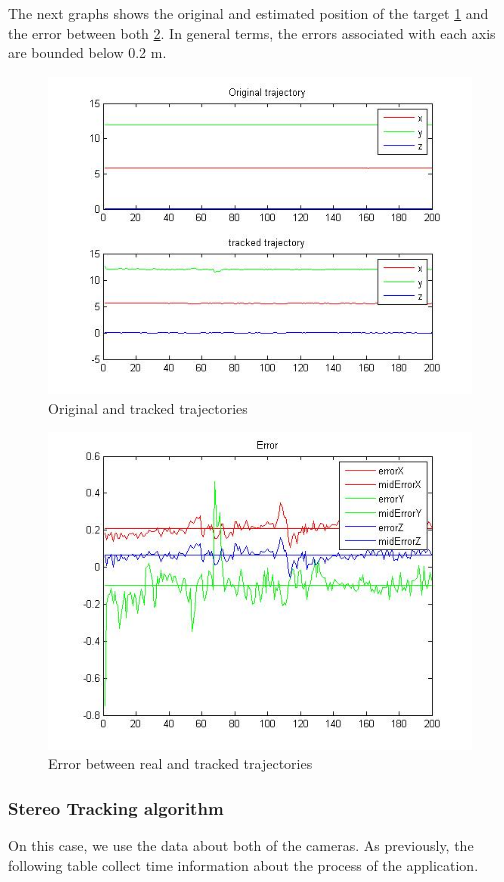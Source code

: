 	The next graphs shows the original and estimated position of the target \ref{fig:trajectories_PC} and the error between both \ref{fig:errors_PC}. In general terms, the errors associated with each axis are bounded below 0.2 m.
	
	\begin{figure}[hp]
		\centering
		\includegraphics[width=0.75\linewidth]{../Images/c4/trajs}
		\caption{Original and tracked trajectories}
		\label{fig:trajectories_PC}
	\end{figure}
	
	\begin{figure}[hp]
		\centering
		\includegraphics[width=0.5\linewidth]{../Images/c4/errors}
		\caption{Error between real and tracked trajectories}
		\label{fig:errors_PC}
	\end{figure}
	
	\newpage	
	\subsubsection{Stereo Tracking algorithm}
	
	On this case, we use the data about both of the cameras. As previously, the following table collect time information about the process of the application. \\
		
